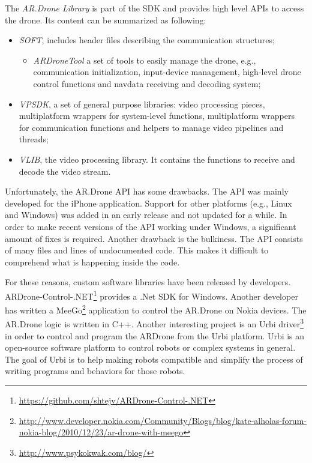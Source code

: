 The \textit{AR.Drone Library} is part of the SDK and provides high level APIs to access the drone.
Its content can be summarized as following:
\begin{itemize}
\item \textit{SOFT}, includes header files describing the communication structures;
	\begin{itemize}
		\item \textit{ARDroneTool} a set of tools to easily manage the drone, e.g., communication initialization, input-device management, high-level drone control functions and navdata receiving and decoding system;
	\end{itemize}
\item \textit{VPSDK}, a set of general purpose libraries: video processing pieces, multiplatform wrappers for system-level functions, multiplatform wrappers for communication functions and helpers to manage video pipelines and threads;
\item \textit{VLIB}, the video processing library. It contains the functions to receive and decode the video stream.
\end{itemize}

Unfortunately, the AR.Drone API has some drawbacks.
The API was mainly developed for the iPhone application.
Support for other platforms (e.g., Linux and Windows) was added in an early release and not updated for a while.
In order to make recent versions of the API working under Windows, a significant amount of fixes is required.
Another drawback is the bulkiness.
The API consists of many files and lines of undocumented code.
This makes it difficult to comprehend what is happening inside the code.

For these reasons, custom software libraries have been released by developers.
ARDrone-Control-.NET\footnote{\url{https://github.com/shtejv/ARDrone-Control-.NET}} provides a .Net SDK for Windows.
Another developer has written a MeeGo\footnote{\url{http://www.developer.nokia.com/Community/Blogs/blog/kate-alholas-forum-nokia-blog/2010/12/23/ar-drone-with-meego}} application to control the AR.Drone on Nokia devices. The AR.Drone logic is written in C++.
Another interesting project is an Urbi driver\footnote{\url{http://www.psykokwak.com/blog/}} in order to control and program the ARDrone from the Urbi platform.
Urbi is an open-source software platform to control robots or complex systems in general. The goal of Urbi is to help making robots compatible and simplify the process of writing programs and behaviors for those robots. 